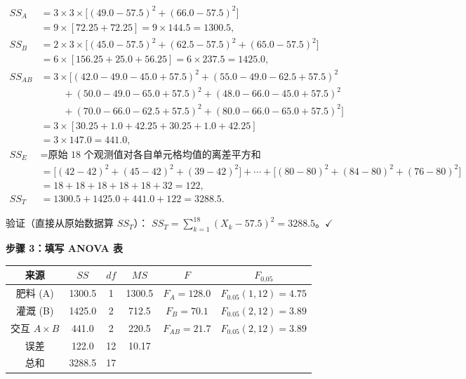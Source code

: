 \begin{example}
\begin{align}
    SS_A &= 3 \times 3 \times \bigl[(49.0-57.5)^2 + (66.0-57.5)^2\bigr] \\
         &= 9 \times [72.25 + 72.25] = 9 \times 144.5 = 1300.5, \\[4pt]
    SS_B &= 2 \times 3 \times \bigl[(45.0-57.5)^2 + (62.5-57.5)^2 + (65.0-57.5)^2\bigr] \\
         &= 6 \times [156.25 + 25.0 + 56.25] = 6 \times 237.5 = 1425.0, \\[4pt]
    SS_{AB} &= 3 \times \bigl[(42.0 - 49.0 - 45.0 + 57.5)^2 + (55.0 - 49.0 - 62.5 + 57.5)^2 \\
            &\qquad\; + (50.0 - 49.0 - 65.0 + 57.5)^2 + (48.0 - 66.0 - 45.0 + 57.5)^2 \\
            &\qquad\; + (70.0 - 66.0 - 62.5 + 57.5)^2 + (80.0 - 66.0 - 65.0 + 57.5)^2\bigr] \\
         &= 3 \times [30.25 + 1.0 + 42.25 + 30.25 + 1.0 + 42.25] \\
         &= 3 \times 147.0 = 441.0, \\[4pt]
    SS_E &= \text{原始 18 个观测值对各自单元格均值的离差平方和} \\
         &= \bigl[(42-42)^2+(45-42)^2+(39-42)^2\bigr] + \cdots + \bigl[(80-80)^2+(84-80)^2+(76-80)^2\bigr] \\
         &= 18 + 18 + 18 + 18 + 18 + 32 = 122, \\[4pt]
    SS_T &= 1300.5 + 1425.0 + 441.0 + 122 = 3288.5.
\end{align}

验证（直接从原始数据算 $SS_T$）：
$SS_T = \sum_{k=1}^{18}(X_k - 57.5)^2 = 3288.5$。$\checkmark$

\textbf{步骤 3：填写 ANOVA 表}

\begin{center}
\begin{tabular}{c|c|c|c|c|c}
    \toprule
    来源 & $SS$ & $df$ & $MS$ & $F$ & $F_{0.05}$ \\
    \midrule
    肥料 (A)       & 1300.5 & 1   & 1300.5 & $F_A = 128.0$   & $F_{0.05}(1,12)=4.75$ \\
    灌溉 (B)       & 1425.0 & 2   & 712.5  & $F_B = 70.1$    & $F_{0.05}(2,12)=3.89$ \\
    交互 $A\!\times\!B$ & 441.0  & 2   & 220.5  & $F_{AB} = 21.7$ & $F_{0.05}(2,12)=3.89$ \\
    误差           & 122.0  & 12  & 10.17  & & \\
    \midrule
    总和           & 3288.5 & 17  & & & \\
    \bottomrule
\end{tabular}
\end{center}


\end{example}
